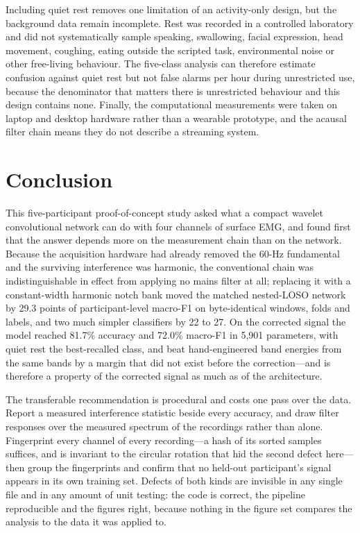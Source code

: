 \documentclass[pdflatex,sn-nature,iicol]{sn-jnl}
\begin{document}
Including quiet rest removes one limitation of an activity-only design, but the background data remain incomplete. Rest was recorded in a controlled laboratory and did not systematically sample speaking, swallowing, facial expression, head movement, coughing, eating outside the scripted task, environmental noise or other free-living behaviour. The five-class analysis can therefore estimate confusion against quiet rest but not false alarms per hour during unrestricted use, because the denominator that matters there is unrestricted behaviour and this design contains none. Finally, the computational measurements were taken on laptop and desktop hardware rather than a wearable prototype, and the acausal filter chain means they do not describe a streaming system.

\section{Conclusion}

This five-participant proof-of-concept study asked what a compact wavelet convolutional network can do with four channels of surface EMG, and found first that the answer depends more on the measurement chain than on the network. Because the acquisition hardware had already removed the 60-Hz fundamental and the surviving interference was harmonic, the conventional chain was indistinguishable in effect from applying no mains filter at all; replacing it with a constant-width harmonic notch bank moved the matched nested-LOSO network by 29.3 points of participant-level macro-F1 on byte-identical windows, folds and labels, and two much simpler classifiers by 22 to 27. On the corrected signal the model reached 81.7\% accuracy and 72.0\% macro-F1 in 5,901 parameters, with quiet rest the best-recalled class, and beat hand-engineered band energies from the same bands by a margin that did not exist before the correction---and is therefore a property of the corrected signal as much as of the architecture.

The transferable recommendation is procedural and costs one pass over the data. Report a measured interference statistic beside every accuracy, and draw filter responses over the measured spectrum of the recordings rather than alone. Fingerprint every channel of every recording---a hash of its sorted samples suffices, and is invariant to the circular rotation that hid the second defect here---then group the fingerprints and confirm that no held-out participant's signal appears in its own training set. Defects of both kinds are invisible in any single file and in any amount of unit testing: the code is correct, the pipeline reproducible and the figures right, because nothing in the figure set compares the analysis to the data it was applied to.
\end{document}
